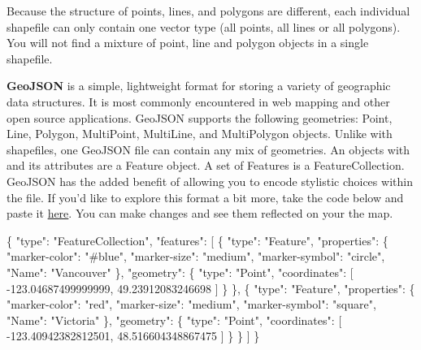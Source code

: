 \documentclass[
]{book}
\newenvironment{Shaded}{\begin{snugshade}}{\end{snugshade}}
\newcommand{\DataTypeTok}[1]{\textcolor[rgb]{0.13,0.29,0.53}{#1}}
\newcommand{\FloatTok}[1]{\textcolor[rgb]{0.00,0.00,0.81}{#1}}
\newcommand{\FunctionTok}[1]{\textcolor[rgb]{0.00,0.00,0.00}{#1}}
\newcommand{\OtherTok}[1]{\textcolor[rgb]{0.56,0.35,0.01}{#1}}
\newcommand{\StringTok}[1]{\textcolor[rgb]{0.31,0.60,0.02}{#1}}
\begin{document}
Because the structure of points, lines, and polygons are different, each individual shapefile can only contain one vector type (all points, all lines or all polygons). You will not find a mixture of point, line and polygon objects in a single shapefile.

\textbf{GeoJSON} is a simple, lightweight format for storing a variety of geographic data structures. It is most commonly encountered in web mapping and other open source applications. GeoJSON supports the following geometries: Point, Line, Polygon, MultiPoint, MultiLine, and MultiPolygon objects. Unlike with shapefiles, one GeoJSON file can contain any mix of geometries. An objects with and its attributes are a Feature object. A set of Features is a FeatureCollection. GeoJSON has the added benefit of allowing you to encode stylistic choices within the file. If you'd like to explore this format a bit more, take the code below and paste it \href{https://geojson.io/\#map=2/20.0/0.0}{here}. You can make changes and see them reflected on your the map.

\begin{Shaded}
\begin{Highlighting}[]
\FunctionTok{\{}
  \DataTypeTok{"type"}\FunctionTok{:} \StringTok{"FeatureCollection"}\FunctionTok{,}
  \DataTypeTok{"features"}\FunctionTok{:} \OtherTok{[}
    \FunctionTok{\{}
      \DataTypeTok{"type"}\FunctionTok{:} \StringTok{"Feature"}\FunctionTok{,}
      \DataTypeTok{"properties"}\FunctionTok{:} \FunctionTok{\{}
        \DataTypeTok{"marker{-}color"}\FunctionTok{:} \StringTok{"\#blue"}\FunctionTok{,}
        \DataTypeTok{"marker{-}size"}\FunctionTok{:} \StringTok{"medium"}\FunctionTok{,}
        \DataTypeTok{"marker{-}symbol"}\FunctionTok{:} \StringTok{"circle"}\FunctionTok{,}
        \DataTypeTok{"Name"}\FunctionTok{:} \StringTok{"Vancouver"}
      \FunctionTok{\},}
      \DataTypeTok{"geometry"}\FunctionTok{:} \FunctionTok{\{}
        \DataTypeTok{"type"}\FunctionTok{:} \StringTok{"Point"}\FunctionTok{,}
        \DataTypeTok{"coordinates"}\FunctionTok{:} \OtherTok{[}
          \FloatTok{{-}123.04687499999999}\OtherTok{,}
          \FloatTok{49.23912083246698}
        \OtherTok{]}
      \FunctionTok{\}}
    \FunctionTok{\}}\OtherTok{,}
    \FunctionTok{\{}
      \DataTypeTok{"type"}\FunctionTok{:} \StringTok{"Feature"}\FunctionTok{,}
      \DataTypeTok{"properties"}\FunctionTok{:} \FunctionTok{\{}
        \DataTypeTok{"marker{-}color"}\FunctionTok{:} \StringTok{"red"}\FunctionTok{,}
        \DataTypeTok{"marker{-}size"}\FunctionTok{:} \StringTok{"medium"}\FunctionTok{,}
        \DataTypeTok{"marker{-}symbol"}\FunctionTok{:} \StringTok{"square"}\FunctionTok{,}
        \DataTypeTok{"Name"}\FunctionTok{:} \StringTok{"Victoria"}
      \FunctionTok{\},}
      \DataTypeTok{"geometry"}\FunctionTok{:} \FunctionTok{\{}
        \DataTypeTok{"type"}\FunctionTok{:} \StringTok{"Point"}\FunctionTok{,}
        \DataTypeTok{"coordinates"}\FunctionTok{:} \OtherTok{[}
          \FloatTok{{-}123.40942382812501}\OtherTok{,}
          \FloatTok{48.516604348867475}
        \OtherTok{]}
      \FunctionTok{\}}
    \FunctionTok{\}}
  \OtherTok{]}
\FunctionTok{\}}
\end{Highlighting}
\end{Shaded}
\end{document}
